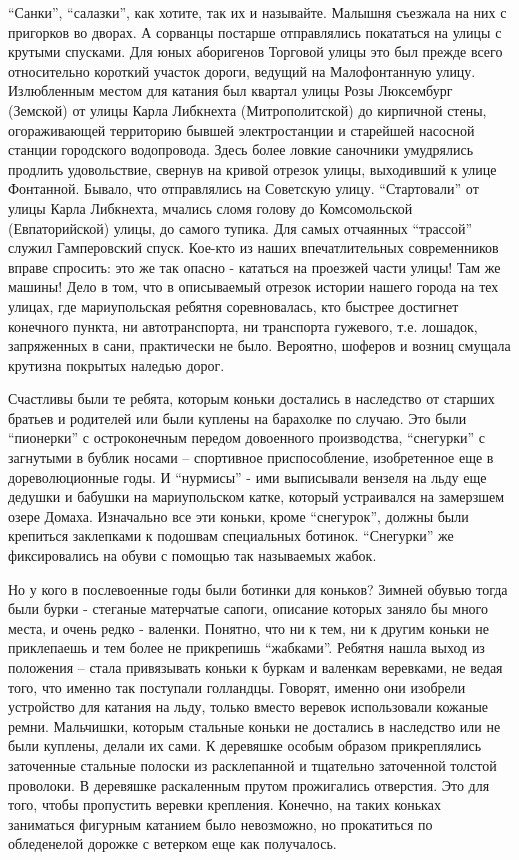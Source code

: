 \enquote{Санки}, \enquote{салазки}, как хотите, так их и называйте. Малышня съезжала на них с
пригорков во дворах. А сорванцы постарше отправлялись покататься на улицы с
крутыми спусками. Для юных аборигенов Торговой улицы это был прежде всего
относительно короткий участок дороги, ведущий на Малофонтанную улицу.
Излюбленным местом для катания был квартал улицы Розы Люксембург (Земской) от
улицы Карла Либкнехта (Митрополитской) до кирпичной стены, огораживающей
территорию бывшей электростанции и старейшей насосной станции городского
водопровода. Здесь более ловкие саночники умудрялись продлить удовольствие,
свернув на кривой отрезок улицы, выходивший к улице Фонтанной. Бывало, что
отправлялись на Советскую улицу. \enquote{Стартовали} от улицы Карла Либкнехта, мчались
сломя голову до Комсомольской (Евпаторийской) улицы, до самого тупика. Для
самых отчаянных \enquote{трассой} служил Гамперовский спуск. Кое-кто из наших
впечатлительных современников вправе спросить: это же так опасно - кататься на
проезжей части улицы! Там же машины! Дело в том, что в описываемый отрезок
истории нашего города на тех улицах, где мариупольская ребятня соревновалась,
кто быстрее достигнет конечного пункта, ни автотранспорта, ни транспорта
гужевого, т.е. лошадок, запряженных в сани, практически не было. Вероятно,
шоферов и возниц смущала крутизна покрытых наледью дорог.

Счастливы были те ребята, которым коньки достались в наследство от старших
братьев и родителей или были куплены на барахолке по случаю. Это были
\enquote{пионерки} с остроконечным передом довоенного производства, \enquote{снегурки} с
загнутыми в бублик носами – спортивное приспособление, изобретенное еще в
дореволюционные годы. И \enquote{нурмисы} - ими выписывали вензеля на льду еще дедушки
и бабушки на мариупольском катке, который устраивался на замерзшем озере
Домаха. Изначально все эти коньки, кроме \enquote{снегурок}, должны были крепиться
заклепками к подошвам специальных ботинок. \enquote{Снегурки} же фиксировались на обуви
с помощью так называемых жабок. 

Но у кого в послевоенные годы были ботинки для коньков? Зимней обувью тогда
были бурки - стеганые матерчатые сапоги, описание которых заняло бы много
места, и очень редко - валенки. Понятно, что ни к тем, ни к другим коньки не
приклепаешь и тем более не прикрепишь \enquote{жабками}. Ребятня нашла выход из
положения – стала привязывать коньки к буркам и валенкам веревками, не ведая
того, что именно так поступали голландцы. Говорят, именно они изобрели
устройство для катания на льду, только вместо веревок использовали кожаные
ремни. Мальчишки, которым стальные коньки не достались в наследство или не были
куплены, делали их сами. К деревяшке особым образом прикреплялись заточенные
стальные полоски из расклепанной и тщательно заточенной толстой проволоки. В
деревяшке раскаленным прутом прожигались отверстия. Это для того, чтобы
пропустить веревки крепления. Конечно, на таких коньках заниматься фигурным
катанием было невозможно, но прокатиться по обледенелой дорожке с ветерком еще
как получалось.

